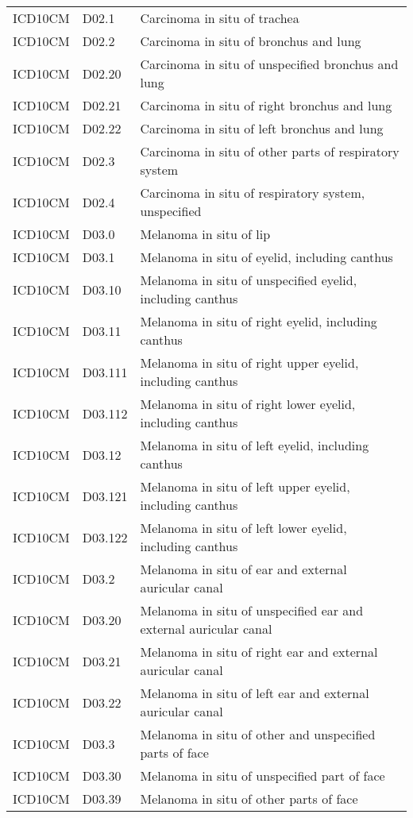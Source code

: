 \begin{longtable}{p{}p{}p{}}
  ICD10CM & D02.1 & Carcinoma in situ of trachea \\ 
  ICD10CM & D02.2 & Carcinoma in situ of bronchus and lung \\ 
  ICD10CM & D02.20 & Carcinoma in situ of unspecified bronchus and lung \\ 
  ICD10CM & D02.21 & Carcinoma in situ of right bronchus and lung \\ 
  ICD10CM & D02.22 & Carcinoma in situ of left bronchus and lung \\ 
  ICD10CM & D02.3 & Carcinoma in situ of other parts of respiratory system \\ 
  ICD10CM & D02.4 & Carcinoma in situ of respiratory system, unspecified \\ 
  ICD10CM & D03.0 & Melanoma in situ of lip \\ 
  ICD10CM & D03.1 & Melanoma in situ of eyelid, including canthus \\ 
  ICD10CM & D03.10 & Melanoma in situ of unspecified eyelid, including canthus \\ 
  ICD10CM & D03.11 & Melanoma in situ of right eyelid, including canthus \\ 
  ICD10CM & D03.111 & Melanoma in situ of right upper eyelid, including canthus \\ 
  ICD10CM & D03.112 & Melanoma in situ of right lower eyelid, including canthus \\ 
  ICD10CM & D03.12 & Melanoma in situ of left eyelid, including canthus \\ 
  ICD10CM & D03.121 & Melanoma in situ of left upper eyelid, including canthus \\ 
  ICD10CM & D03.122 & Melanoma in situ of left lower eyelid, including canthus \\ 
  ICD10CM & D03.2 & Melanoma in situ of ear and external auricular canal \\ 
  ICD10CM & D03.20 & Melanoma in situ of unspecified ear and external auricular canal \\ 
  ICD10CM & D03.21 & Melanoma in situ of right ear and external auricular canal \\ 
  ICD10CM & D03.22 & Melanoma in situ of left ear and external auricular canal \\ 
  ICD10CM & D03.3 & Melanoma in situ of other and unspecified parts of face \\ 
  ICD10CM & D03.30 & Melanoma in situ of unspecified part of face \\ 
  ICD10CM & D03.39 & Melanoma in situ of other parts of face \\ 

\end{longtable}
